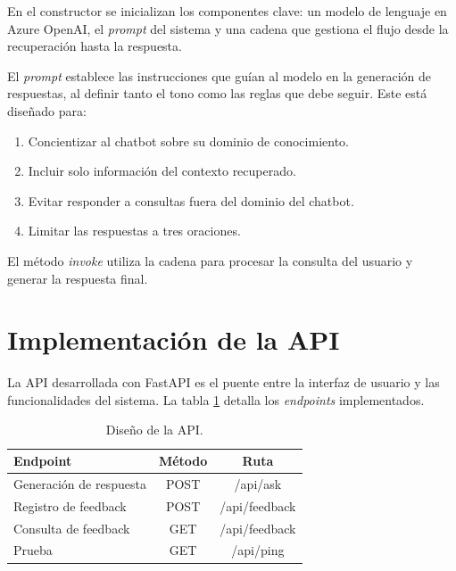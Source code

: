 En el constructor se inicializan los componentes clave: un modelo de lenguaje en Azure OpenAI, 
el \textit{prompt} del sistema y una cadena que gestiona el flujo desde la recuperación hasta la respuesta.

El \textit{prompt} establece las instrucciones que guían al modelo en la generación de respuestas, al definir 
tanto el tono como las reglas que debe seguir. Este está diseñado para:

\begin{enumerate}
	\item Concientizar al chatbot sobre su dominio de conocimiento.
    \item Incluir solo información del contexto recuperado.
    \item Evitar responder a consultas fuera del dominio del chatbot.
    \item Limitar las respuestas a tres oraciones.
\end{enumerate}

El método \textit{invoke} utiliza la cadena para procesar la consulta del usuario y generar la respuesta final.

\section{Implementación de la API}

La API desarrollada con FastAPI es el puente entre la interfaz de usuario y las funcionalidades del sistema. La 
tabla \ref{tab:api} detalla los \textit{endpoints} implementados.

\begin{table}[h]
	\centering
	\caption[Diseño de la API]{Diseño de la API.}
	\begin{tabular}{l c c}    
		\toprule
		\textbf{Endpoint} 	     & \textbf{Método} 	& \textbf{Ruta}  \\
		\midrule
		Generación de respuesta  &  POST 		    & /api/ask       \\		
		Registro de feedback     &  POST		    & /api/feedback  \\
		Consulta de feedback	 &  GET             & /api/feedback  \\
		Prueba                   &  GET             & /api/ping      \\
		\bottomrule
		\hline
	\end{tabular}
	\label{tab:api}
\end{table}

